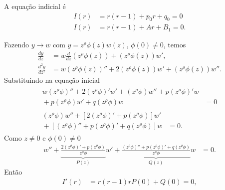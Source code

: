 \documentclass[a4paper,12pt, leqno, answers]{exam}
\begin{document}
\begin{questions}
\begin{solution}
        A equa\c{c}\~{a}o indicial \'{e}
        \begin{align*}
            I(r) &= r\left( r - 1 \right) + p_0 r + q_0 = 0 \\
            I(r) &= r\left( r - 1 \right) + A r + B_1 = 0.
        \end{align*}

        Fazendo $y \to w$ com $y = z^\rho \phi\left( z \right) w\left( z \right)$, $\phi\left( 0 \right) \neq 0$, temos
        \begin{align*}
            \frac{d y}{d z} &= w \frac{d}{d z}\left( z^\rho \phi\left( z \right) \right) + \left(z^\rho \phi \left(z\right)\right) w',\\
            \frac{d^2 y}{d z^2} &= w\left( z^\rho \phi\left( z \right) \right)'' + 2 \left( z^\rho \phi \left(z\right) \right) w' + \left( z^\rho \phi \left(z\right) \right) w''.
        \end{align*}
        Substituindo na equa\c{c}\~{a}o inicial
        \begin{align*}
            \begin{split}
                w \left( z^\rho \phi \right)'' + 2 \left( z^\rho \phi \right)' w' + \left( z^\rho \phi \right) w'' + p \left( z^\rho \phi \right)' w \\ {}+ p \left( z^\rho \phi \right) w' + q \left( z^\rho \phi \right) w &= 0
            \end{split} \\
            \begin{split}
                \left( z^\rho \phi \right) w'' + \left[ 2 \left( z^\rho \phi \right)' + p \left( z^\rho \phi \right) \right] w' \\ {}+ \left[ \left( z^\rho \phi \right)'' + p \left( z^\rho \phi \right)' + q \left( z^\rho \phi \right) \right] w &= 0.
            \end{split}
        \end{align*}
        Como $z \neq 0$ e $\phi(0) \neq 0$
        \begin{align*}
            w'' + \underbrace{\frac{2\left( z^\rho \phi \right)' + p \left( z^\rho \phi \right)}{z^\rho \phi}}_{P(z)} w' + \underbrace{\frac{\left( z^\rho \phi \right)'' + p \left( z^\rho \phi \right)' + q\left( z^\rho \phi \right)}{z^\rho \phi}}_{Q(z)} w &= 0.
        \end{align*}
        Ent\~{a}o
        \begin{align*}
            I'(r) &= r \left( r - 1 \right) r P(0) + Q(0) = 0, \\

\end{align*}
\end{solution}
\end{questions}
\end{document}
